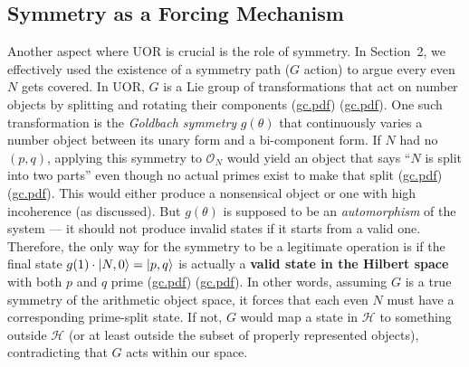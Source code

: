 \documentclass[12pt]{article}
\begin{document}
\subsection{Symmetry as a Forcing Mechanism}
Another aspect where UOR is crucial is the role of symmetry. In Section~2, we effectively used the existence of a symmetry path ($G$ action) to argue every even $N$ gets covered. In UOR, $G$ is a Lie group of transformations that act on number objects by splitting and rotating their components (\href{file://file-7ZYYwSHWVa83XEVTrEhg5z#:~:text=The%20Clifford%20algebra%20provides%20a,Because%20the%20Clifford%20algebra}{gc.pdf}) (\href{file://file-7ZYYwSHWVa83XEVTrEhg5z#:~:text=%24G%24%20action%20mixing%20%24N%24%20and,UOR%20realization%20of%20the%20%24G}{gc.pdf}). One such transformation is the \emph{Goldbach symmetry} $g(\theta)$ that continuously varies a number object between its unary form and a bi-component form. If $N$ had no $(p,q)$, applying this symmetry to $\mathcal{O}_N$ would yield an object that says ``$N$ is split into two parts'' even though no actual primes exist to make that split (\href{file://file-7ZYYwSHWVa83XEVTrEhg5z#:~:text=symmetry%20is%20a%20true%20automorphism,primes%20%24p%2Cq%24%20to%20back%20it}{gc.pdf}) (\href{file://file-7ZYYwSHWVa83XEVTrEhg5z#:~:text=%24N%24%20had%20no%20prime%20split%2C,contraposition%2C%20if%20the%20symmetry%20is}{gc.pdf}). This would either produce a nonsensical object or one with high incoherence (as discussed). But $g(\theta)$ is supposed to be an \emph{automorphism} of the system --- it should not produce invalid states if it starts from a valid one. Therefore, the only way for the symmetry to be a legitimate operation is if the final state $g(1)\cdot\ket{N,0} = \ket{p,q}$ is actually a \textbf{valid state in the Hilbert space} with both $p$ and $q$ prime (\href{file://file-7ZYYwSHWVa83XEVTrEhg5z#:~:text=manifold%20of%20numbers%20%E2%80%93%20it,assume%20the%20symmetry%20is%20an}{gc.pdf}) (\href{file://file-7ZYYwSHWVa83XEVTrEhg5z#:~:text=%24N%24%20had%20no%20prime%20split%2C,contraposition%2C%20if%20the%20symmetry%20is}{gc.pdf}). In other words, assuming $G$ is a true symmetry of the arithmetic object space, it forces that each even $N$ must have a corresponding prime-split state. If not, $G$ would map a state in $\mathcal{H}$ to something outside $\mathcal{H}$ (or at least outside the subset of properly represented objects), contradicting that $G$ acts within our space.
\end{document}
